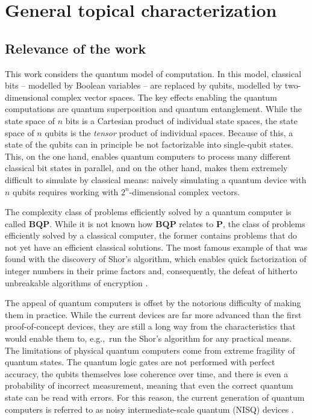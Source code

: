 \section*{General topical characterization} 

\subsection*{Relevance of the work} 

This work considers the quantum model of computation. In this model, classical bits -- modelled by Boolean variables -- are replaced by qubits, modelled by two-dimensional complex vector spaces. The key effects enabling the quantum computations are quantum superposition and quantum entanglement. While the state space of $n$ bits is a Cartesian product of individual state spaces, the state space of $n$ qubits is the \textit{tensor} product of individual spaces. Because of this, a state of the qubits can in principle be not factorizable into single-qubit states. This, on the one hand, enables quantum computers to process many different classical bit states in parallel, and on the other hand, makes them extremely difficult to simulate by classical means: naively simulating a quantum device with $n$ qubits requires working with $2^n$-dimensional complex vectors.

The complexity class of problems efficiently solved by a quantum computer is called $\mathbf{BQP}$. While it is not known how $\mathbf{BQP}$ relates to $\mathbf{P}$, the class of problems efficiently solved by a classical computer, the former contains problems that do not yet have an efficient classical solutions. The most famous example of that was found with the discovery of Shor's algorithm, which enables quick factorization of integer numbers in their prime factors and, consequently, the defeat of hitherto unbreakable algorithms of encryption \cite{nielsen_quantum_2010}.

The appeal of quantum computers is offset by the notorious difficulty of making them in practice. While the current devices are far more advanced than the first proof-of-concept devices, they are still a long way from the characteristics that would enable them to, e.g.,~run the Shor's algorithm for any practical means. 
The limitations of physical quantum computers come from extreme fragility of quantum states. The quantum logic gates are not performed with perfect accuracy, the qubits themselves lose coherence over time, and there is even a probability of incorrect measurement, meaning that even the correct quantum state can be read with errors. For this reason, the current generation of quantum computers is referred to as noisy intermediate-scale quantum (NISQ) devices \cite{bharti_noisy_2021}.

